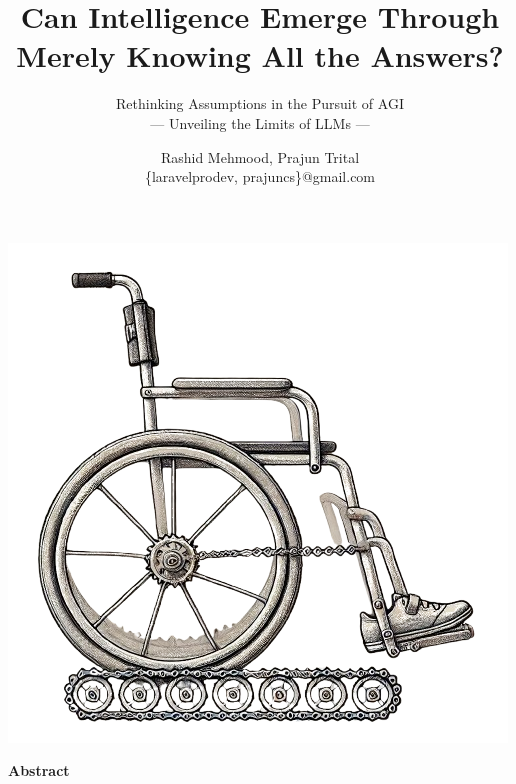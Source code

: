 \documentclass[11pt]{scrartcl}
\begin{document}
\title{Can Intelligence Emerge Through Merely Knowing All the Answers?}
\subtitle{Rethinking Assumptions in the Pursuit of AGI \\ — Unveiling the Limits of LLMs —}
\author{Rashid Mehmood, Prajun Trital \\ \{laravelprodev, prajuncs\}@gmail.com }

\maketitle

\includegraphics[scale=0.6, center]{title_wheelchair.png}

\vspace{2cm}

\begin{center}
\begin{Huge}
\textbf{Abstract}
\end{Huge}
\end{center}
\end{document}
